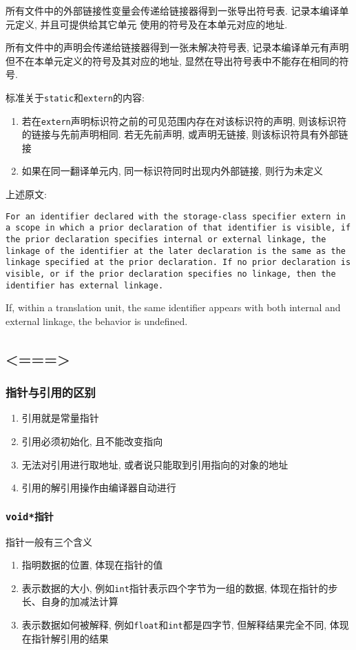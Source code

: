 \vspace{1em}
所有文件中的外部链接性变量会传递给链接器得到一张导出符号表. 记录本编译单元定义, 并且可提供给其它单元
	使用的符号及在本单元对应的地址. 

所有文件中的声明会传递给链接器得到一张未解决符号表, 记录本编译单元有声明但不在本单元定义的符号及其对应的地址, 
	显然在导出符号表中不能存在相同的符号.

标准关于{\tt static}和{\tt extern}的内容:
\begin{enumerate}
	\item 若在{\tt extern}声明标识符之前的可见范围内存在对该标识符的声明, 则该标识符的链接与先前声明相同. 
			若无先前声明, 或声明无链接, 则该标识符具有外部链接
	\item 如果在同一翻译单元内, 同一标识符同时出现内外部链接, 则行为未定义
\end{enumerate}
上述原文:

{\tt For an identifier declared with the storage-class specifier extern in a scope 
in which a prior declaration of that identifier is visible, if the prior 
declaration specifies internal or external linkage, the linkage of the 
identifier at the later declaration is the same as the linkage specified 
at the prior declaration. If no prior declaration is visible, or if the 
prior declaration specifies no linkage, then the identifier has external 
linkage.

If, within a translation unit, the same identifier appears with both internal 
and external linkage, the behavior is undefined.}
\subsection{<===>\color{purple}{指针与引用}}
\subsubsection{指针与引用的区别}
\begin{enumerate}
	\item 引用就是常量指针
	\item 引用必须初始化, 且不能改变指向
	\item 无法对引用进行取地址, 或者说只能取到引用指向的对象的地址
	\item 引用的解引用操作由编译器自动进行
\end{enumerate}
\subsubsection{\tt{void*}指针}
指针一般有三个含义
\begin{enumerate}
	\item 指明数据的位置, 体现在指针的值
	\item 表示数据的大小, 例如{\tt int}指针表示四个字节为一组的数据, 体现在指针的步长、自身的加减法计算
	\item 表示数据如何被解释, 例如{\tt float}和{\tt int}都是四字节, 但解释结果完全不同, 体现在指针解引用的结果
\end{enumerate}

